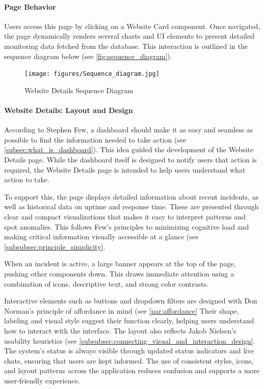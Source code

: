 \paragraph{Page Behavior}
Users access this page by clicking on a Website Card component. Once navigated, the page dynamically renders several charts and UI elements to present detailed monitoring data fetched from the database. This interaction is outlined in the sequence diagram below (see \autoref{fig:sequence_diagram}).

\begin{figure}[htbp]
        \centering
        \texttt{[image: figures/Sequence\_diagram.jpg]}
        \caption{Website Details Sequence Diagram}
        \label{fig:sequence_diagram}
\end{figure}

\paragraph{Website Details: Layout and Design}

According to Stephen Few, a dashboard should make it as easy and seamless as possible to find the information needed to take action (see \ref{subsec:what_is_dashboard}). This idea guided the development of the Website Details page. While the dashboard itself is designed to notify users that action is required, the Website Details page is intended to help users understand what action to take.

To support this, the page displays detailed information about recent incidents, as well as historical data on uptime and response time. These are presented through clear and compact visualizations that makes it easy to interpret patterns and spot anomalies. This follows Few's principles to minimizing cognitive load and making critical information visually accessible at a glance (see \ref{subsubsec:principle_simplicity}.

When an incident is active, a large banner appears at the top of the page, pushing other components down. This draws immediate attention using a combination of icons, descriptive text, and strong color contrasts. 

Interactive elements such as buttons and dropdown filters are designed with Don Norman's principle of affordance in mind (see \ref{par:affordance} Their shape, labeling and visual style suggest their function clearly, helping users understand how to interact with the interface. The layout also reflects Jakob Nielsen's usability heuristics (see \ref{subsubsec:connecting_visual_and_interaction_design}. The system's status is always visible through updated status indicators and live chats, ensuring that users are kept informed. The use of consistent styles, icons, and layout patterns across the application reduces confusion and supports a more user-friendly experience. 


